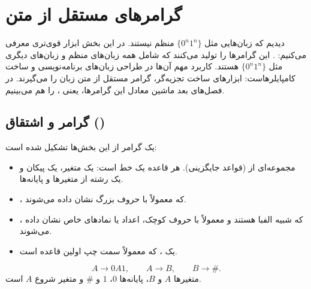 \chapter{گرامرهای مستقل از متن}

دیدیم که زبان‌هایی مثل $\{0^n1^n\}$ منظم نیستند. در این بخش ابزار قوی‌تری معرفی می‌کنیم: . این گرامرها  را تولید می‌کنند که شامل همه زبان‌های منظم و زبان‌های دیگری مثل $\{0^n1^n\}$ هستند. کاربرد مهم آن‌ها در طراحی زبان‌های برنامه‌نویسی و ساخت  کامپایلرهاست: ابزارهای ساخت تجزیه‌گر، گرامر مستقل از متن زبان را می‌گیرند. در فصل‌های بعد ماشین معادل این گرامرها، یعنی ، را هم می‌بینیم.

\begin{ltrfig}
\end{ltrfig}

\section{گرامر و اشتقاق ()}

یک گرامر از این بخش‌ها تشکیل شده است:
\begin{itemize}
\item مجموعه‌ای از  (قواعد جایگزینی). هر قاعده یک خط است: یک متغیر، یک پیکان و یک رشته از متغیرها و پایانه‌ها.
\item {}، که معمولاً با حروف بزرگ نشان داده می‌شوند.
\item {}، که شبیه الفبا هستند و معمولاً با حروف کوچک، اعداد یا نمادهای خاص نشان داده می‌شوند.
\item یک ، که معمولاً سمت چپ اولین قاعده است.
\end{itemize}

\begin{example}[گرامر $G_1$]
\[A\to0A1,\qquad A\to B,\qquad B\to\#.\]
متغیرها $A$ و $B$، پایانه‌ها $0$، $1$ و $\#$ و متغیر شروع $A$ است.
\end{example}

